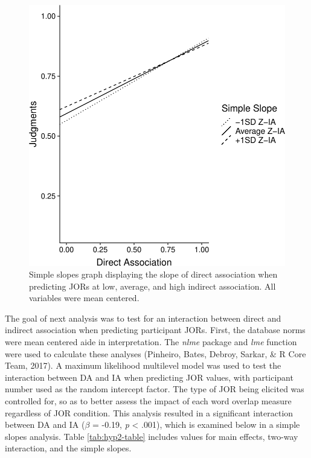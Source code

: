 \documentclass[english,,man]{apa6}
\begin{document}
\begin{figure}
\centering
\includegraphics{max_buch_JOL_files/figure-latex/hyp2graph-1.pdf}
\caption{\label{fig:hyp2graph}Simple slopes graph displaying the slope of direct association when predicting JORs at low, average, and high indirect association. All variables were mean centered.}
\end{figure}

The goal of next analysis was to test for an interaction between direct and indirect association when predicting participant JORs. First, the database norms were mean centered aide in interpretation. The \emph{nlme} package and \emph{lme} function were used to calculate these analyses (Pinheiro, Bates, Debroy, Sarkar, \& R Core Team, 2017). A maximum likelihood multilevel model was used to test the interaction between DA and IA when predicting JOR values, with participant number used as the random intercept factor. The type of JOR being elicited was controlled for, so as to better assess the impact of each word overlap measure regardless of JOR condition. This analysis resulted in a significant interaction between DA and IA (\(\beta\) = -0.19, \emph{p} \textless{} .001), which is examined below in a simple slopes analysis. Table \ref{tab:hyp2-table} includes values for main effects, two-way interaction, and the simple slopes.
\end{document}
